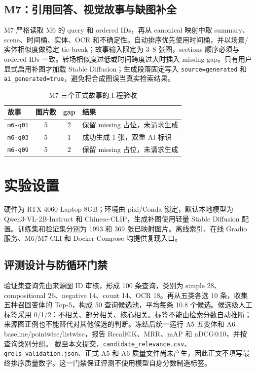 \documentclass[UTF8,11pt,a4paper]{ctexart}
\newcommand{\code}[1]{\texttt{\small #1}}
\begin{document}
\subsection{M7：引用回答、视觉故事与缺图补全}
M7 严格读取 M6 的 query 和 ordered IDs，再从 canonical 映射中取 summary、scene、时间桶、实体、OCR 和不确定性。自动排序优先使用时间桶，并以场景/实体相似度做稳定 tie-break；故事输入限定为 3--8 张图，sections 顺序必须与 ordered IDs 一致。转场相似度过低或时间跨度过大时插入 missing gap。只有用户显式启用补图才加载 Stable Diffusion；生成段落固定写入 \code{source=generated} 和 \code{ai\_generated=true}，避免将合成图误当真实检索结果。
\begin{table}[H]\centering\small\caption{M7 三个正式故事的工程验收}\begin{tabular}{l c c l}\toprule 故事 & 图片数 & gap & 结果\\\midrule \code{m6-q01} & 5 & 2 & 保留 missing 占位，未请求生成\\\code{m6-q03} & 5 & 1 & 成功生成 1 张，双重 AI 标识\\\code{m6-q09} & 5 & 2 & 保留 missing 占位，未请求生成\\\bottomrule\end{tabular}\end{table}
\section{实验设置}
硬件为 RTX 4060 Laptop 8GB；环境由 pixi/Conda 锁定，默认本地模型为 Qwen3-VL-2B-Instruct 和 Chinese-CLIP，生成补图使用轻量 Stable Diffusion 配置。训练集和验证集分别为 1993 和 369 张已映射图片。离线索引、在线 Gradio 服务、M6/M7 CLI 和 Docker Compose 均提供复现入口。
\subsection{评测设计与防循环门禁}
验证集查询先由来源图 ID 审核，形成 100 条查询，类别为 simple 28、compositional 26、negative 14、count 14、OCR 18。再从五类各选 10 条，收集五种召回变体的 Top-5，构成 50 查询候选池，平均每条 10.8 个候选。候选级人工标签采用 0/1/2：不相关、部分相关、核心相关。标签不能由检索分数自动推断；来源图正例也不能替代对其他候选的判断。冻结后统一运行 A5 五变体和 A6 baseline/pointwise/listwise，报告 Recall@K、MRR、mAP 和 nDCG@10，并按查询类别分组。
截至本文提交，\code{candidate\_relevance.csv}、\code{qrels\_validation.json}、正式 A5 和 A6 质量文件尚未产生，因此正文不填写最终排序质量数字。这一门禁保证评测不使用模型自身分数制造标签。
\end{document}
